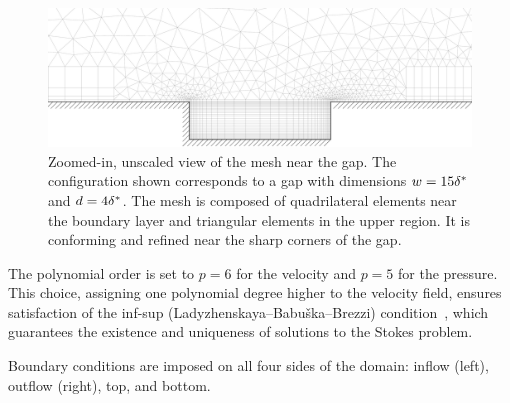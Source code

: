 \documentclass[../main.tex]{subfiles}
\begin{document}
\begin{figure}[ht]
	\centering
	\includegraphics[width=\textwidth]{../../Images/mesh.pdf}
	\caption{Zoomed-in, unscaled view of the mesh near the gap. The configuration shown corresponds to a gap with dimensions $w = 15{\delta^*}$ and $d = 4{\delta^*}$. The mesh is composed of quadrilateral elements near the boundary layer and triangular elements in the upper region. It is conforming and refined near the sharp corners of the gap.}
	\label{fig:mesh}
\end{figure}
The polynomial order is set to $p=6$ for the velocity and $p=5$ for the pressure. This choice, assigning one polynomial degree higher to the velocity field, ensures satisfaction of the inf-sup (Ladyzhenskaya--Babuška--Brezzi) condition~\cite{infsupCondition,nektar}, which guarantees the existence and uniqueness of solutions to the Stokes problem.

Boundary conditions are imposed on all four sides of the domain: inflow (left), outflow (right), top, and bottom.
\end{document}
